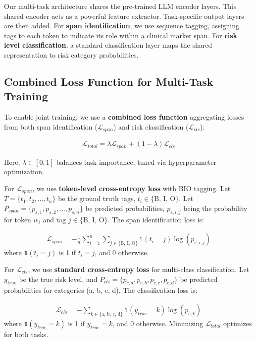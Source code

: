 Our multi-task architecture shares the pre-trained LLM encoder layers. This shared encoder acts as a powerful feature extractor. Task-specific output layers are then added. For \textbf{span identification}, we use sequence tagging, assigning tags to each token to indicate its role within a clinical marker span. For \textbf{risk level classification}, a standard classification layer maps the shared representation to risk category probabilities.

\subsection{Combined Loss Function for Multi-Task Training}

To enable joint training, we use a \textbf{combined loss function} aggregating losses from both span identification ($\mathcal{L}_{span}$) and risk classification ($\mathcal{L}_{cls}$):

\begin{align}
\mathcal{L}_{total} = \lambda \mathcal{L}_{span} + (1 - \lambda) \mathcal{L}_{cls}
\end{align}

Here, $\lambda \in [0, 1]$ balances task importance, tuned via hyperparameter optimization.

For $\mathcal{L}_{span}$, we use \textbf{token-level cross-entropy loss} with BIO tagging. Let $T = \{t_1, t_2, ..., t_n\}$ be the ground truth tags, $t_i \in \{\text{B, I, O}\}$. Let $P_{span} = \{p_{s,1}, p_{s,2}, ..., p_{s,n}\}$ be predicted probabilities, $p_{s,i,j}$ being the probability for token $w_i$ and tag $j \in \{\text{B, I, O}\}$. The span identification loss is:

\begin{align}
\mathcal{L}_{span} = - \frac{1}{n} \sum_{i=1}^{n} \sum_{j \in \{\text{B, I, O}\}} \mathbb{1}(t_i = j) \log(p_{s,i,j})
\end{align}
where $\mathbb{1}(t_i = j)$ is 1 if $t_i = j$, and 0 otherwise.

For $\mathcal{L}_{cls}$, we use \textbf{standard cross-entropy loss} for multi-class classification. Let $y_{true}$ be the true risk level, and $P_{cls} = \{p_{c,a}, p_{c,b}, p_{c,c}, p_{c,d}\}$ be predicted probabilities for categories (a, b, c, d). The classification loss is:

\begin{align}
\mathcal{L}_{cls} = - \sum_{k \in \{\text{a, b, c, d}\}} \mathbb{1}(y_{true} = k) \log(p_{c,k})
\end{align}
where $\mathbb{1}(y_{true} = k)$ is 1 if $y_{true} = k$, and 0 otherwise. Minimizing $\mathcal{L}_{total}$ optimizes for both tasks.

